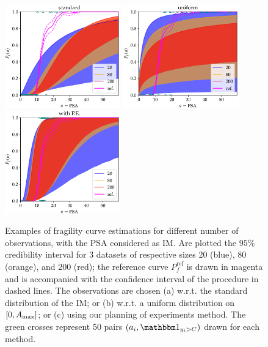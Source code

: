 \begin{figure}
    \centering%
    \includegraphics[width=5cm]{figures/low-doe/curves_standard.pdf}%
    \includegraphics[width=5cm]{figures/low-doe/curves_unif.pdf}%
    \includegraphics[width=5cm]{figures/low-doe/curves_PE.pdf}\\
    \caption{Examples of fragility curve estimations for different number of observations, with the PSA considered as IM. Are plotted the $95\%$ credibility interval for 3 datasets of respective sizes 20 (blue), 80 (orange), and 200 (red); the reference curve $P_f^{\mathrm{ref}}$ is drawn in magenta and is accompanied with the confidence interval of the procedure in dashed lines.
    The observations are chosen (a) w.r.t.{ }the standard distribution of the IM; 
    {or (b) w.r.t.{ }a uniform distribution on $[0,A_{\rm max}]$};
    or (c) using our planning of experiments method. The green crosses represent 50 pairs $(a_i,\indic_{y_i>C})$ drawn for each method.}
    \label{lowdoe:fig:examples}
\end{figure}


